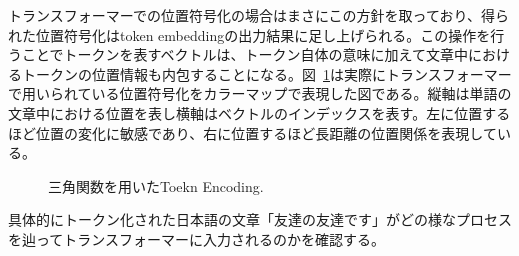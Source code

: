 
トランスフォーマーでの位置符号化の場合はまさにこの方針を取っており、得られた位置符号化はtoken embeddingの出力結果に足し上げられる。この操作を行うことでトークンを表すベクトルは、トークン自体の意味に加えて文章中におけるトークンの位置情報も内包することになる。図~\ref{fig:tri-pos-encoding}は実際にトランスフォーマーで用いられている位置符号化をカラーマップで表現した図である。縦軸は単語の文章中における位置を表し横軸はベクトルのインデックスを表す。左に位置するほど位置の変化に敏感であり、右に位置するほど長距離の位置関係を表現している。
\begin{figure}
  \centering

  \caption{三角関数を用いたToekn Encoding.}
\label{fig:tri-pos-encoding}
\end{figure}

具体的にトークン化された日本語の文章「友達の友達です」がどの様なプロセスを辿ってトランスフォーマーに入力されるのかを確認する。


